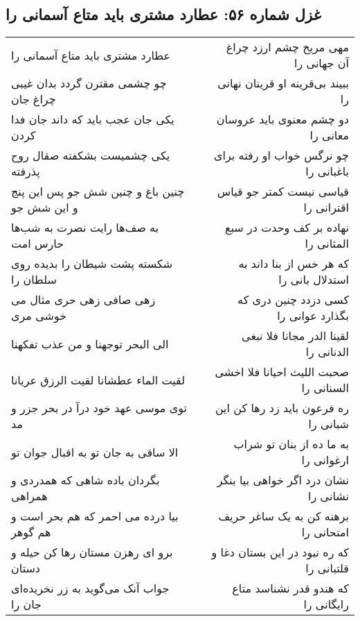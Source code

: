 \begin{center}
\section*{غزل شماره ۵۶: عطارد مشتری باید متاع آسمانی را}
\label{sec:0056}
\begin{longtable}{l p{0.5cm} r}
عطارد مشتری باید متاع آسمانی را
&&
مهی مریخ چشم ارزد چراغ آن جهانی را
\\
چو چشمی مقترن گردد بدان غیبی چراغ جان
&&
ببیند بی‌قرینه او قرینان نهانی را
\\
یکی جان عجب باید که داند جان فدا کردن
&&
دو چشم معنوی باید عروسان معانی را
\\
یکی چشمیست بشکفته صقال روح پذرفته
&&
چو نرگس خواب او رفته برای باغبانی را
\\
چنین باغ و چنین شش جو پس این پنج و این شش جو
&&
قیاسی نیست کمتر جو قیاس اقترانی را
\\
به صف‌ها رایت نصرت به شب‌ها حارس امت
&&
نهاده بر کف وحدت در سبع المثانی را
\\
شکسته پشت شیطان را بدیده روی سلطان را
&&
که هر خس از بنا داند به استدلال بانی را
\\
زهی صافی زهی حری مثال می خوشی مری
&&
کسی دزدد چنین دری که بگذارد عوانی را
\\
الی البحر توجهنا و من عذب تفکهنا
&&
لقینا الدر مجانا فلا نبغی الدنانی را
\\
لقیت الماء عطشانا لقیت الرزق عریانا
&&
صحبت اللیث احیانا فلا اخشی السنانی را
\\
توی موسی عهد خود درآ در بحر جزر و مد
&&
ره فرعون باید زد رها کن این شبانی را
\\
الا ساقی به جان تو به اقبال جوان تو
&&
به ما ده از بنان تو شراب ارغوانی را
\\
بگردان باده شاهی که همدردی و همراهی
&&
نشان درد اگر خواهی بیا بنگر نشانی را
\\
بیا درده می احمر که هم بحر است و هم گوهر
&&
برهنه کن به یک ساغر حریف امتحانی را
\\
برو ای رهزن مستان رها کن حیله و دستان
&&
که ره نبود در این بستان دغا و قلتبانی را
\\
جواب آنک می‌گوید به زر نخریده‌ای جان را
&&
که هندو قدر نشناسد متاع رایگانی را
\\
\end{longtable}
\end{center}
